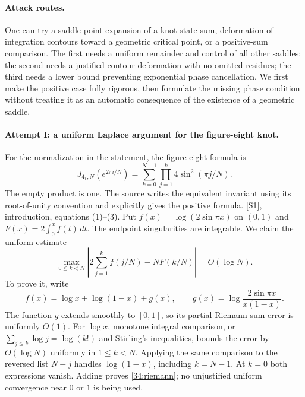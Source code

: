 \documentclass[11pt,a4paper]{article}
\newcommand{\sref}[2]{\hyperlink{source:#1:#2}{[S#2]}}
\numberwithin{equation}{section}
\begin{document}
\paragraph{Attack routes.}
One can try a saddle-point expansion of a knot state sum, deformation
of integration contours toward a geometric critical point, or a
positive-sum comparison.  The first needs a uniform remainder and control
of all other saddles; the second needs a justified contour deformation
with no omitted residues; the third needs a lower bound preventing
exponential phase cancellation.  We first make the positive case fully
rigorous, then formulate the missing phase condition without treating it
as an automatic consequence of the existence of a geometric saddle.

\paragraph{Attempt I: a uniform Laplace argument for the figure-eight knot.}
For the normalization in the statement, the figure-eight formula is
\begin{equation}\label{34:sum}
 J_{4_1,N}(e^{2\pi i/N})=
 \sum_{k=0}^{N-1}\prod_{j=1}^{k}4\sin^2(\pi j/N).
\end{equation}
The empty product is one.  The source writes the equivalent invariant
using its root-of-unity convention and explicitly gives the positive
formula. \sref{34}{1}, introduction, equations (1)--(3).
Put $f(x)=\log(2\sin\pi x)$ on $(0,1)$ and
$F(x)=2\int_0^x f(t)\,dt$.  The endpoint singularities are integrable.
We claim the uniform estimate
\begin{equation}\label{34:riemann}
 \max_{0\leq k<N}\left|
 2\sum_{j=1}^k f(j/N)-NF(k/N)\right|=O(\log N).
\end{equation}
To prove it, write
\[
 f(x)=\log x+\log(1-x)+g(x),\qquad
 g(x)=\log\frac{2\sin\pi x}{x(1-x)}.
\]
The function $g$ extends smoothly to $[0,1]$, so its partial Riemann-sum
error is uniformly $O(1)$.  For $\log x$, monotone integral comparison,
or $\sum_{j\leq k}\log j=\log(k!)$ and Stirling's inequalities, bounds
the error by $O(\log N)$ uniformly in $1\leq k<N$.  Applying the same
comparison to the reversed list $N-j$ handles $\log(1-x)$, including
$k=N-1$.  At $k=0$ both expressions vanish.  Adding proves
\eqref{34:riemann}; no unjustified uniform convergence near $0$ or $1$
is being used.
\end{document}
